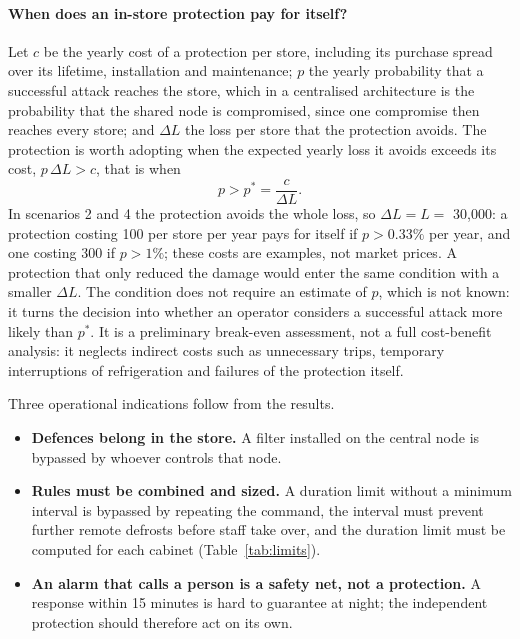 \documentclass{ceurart}
\begin{document}
\paragraph{When does an in-store protection pay for itself?}
Let $c$ be the yearly cost of a protection per store, including its purchase spread over its lifetime, installation and maintenance; $p$ the yearly probability that a successful attack reaches the store, which in a centralised architecture is the probability that the shared node is compromised, since one compromise then reaches every store; and $\Delta L$ the loss per store that the protection avoids.
The protection is worth adopting when the expected yearly loss it avoids exceeds its cost, $p\,\Delta L > c$, that is when
\begin{equation}
  p > p^{*} = \frac{c}{\Delta L}.
  \label{eq:breakeven}
\end{equation}
In scenarios 2 and 4 the protection avoids the whole loss, so $\Delta L = L = $ \texteuro{}30{,}000: a protection costing \texteuro{}100 per store per year pays for itself if $p > 0.33\%$ per year, and one costing \texteuro{}300 if $p > 1\%$; these costs are examples, not market prices.
A protection that only reduced the damage would enter the same condition with a smaller $\Delta L$.
The condition does not require an estimate of $p$, which is not known: it turns the decision into whether an operator considers a successful attack more likely than $p^*$.
It is a preliminary break-even assessment, not a full cost-benefit analysis: it neglects indirect costs such as unnecessary trips, temporary interruptions of refrigeration and failures of the protection itself.

Three operational indications follow from the results.
\begin{itemize}
  \item \textbf{Defences belong in the store.} A filter installed on the central node is bypassed by whoever controls that node.
  \item \textbf{Rules must be combined and sized.} A duration limit without a minimum interval is bypassed by repeating the command, the interval must prevent further remote defrosts before staff take over, and the duration limit must be computed for each cabinet (Table~\ref{tab:limits}).
  \item \textbf{An alarm that calls a person is a safety net, not a protection.} A response within 15 minutes is hard to guarantee at night; the independent protection should therefore act on its own.
\end{itemize}
\end{document}
